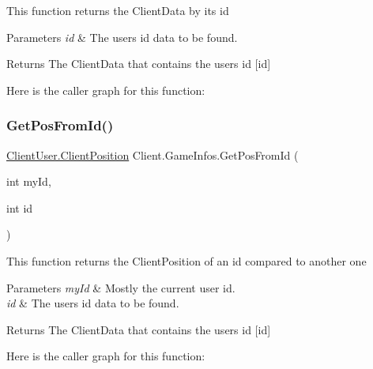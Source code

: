 This function returns the Client\+Data by its id 
\begin{DoxyParams}{Parameters}
{\em id} & The user\textquotesingle{}s id data to be found. \\
\hline
\end{DoxyParams}
\begin{DoxyReturn}{Returns}
The Client\+Data that contains the user\textquotesingle{}s id \mbox{[}id\mbox{]} 
\end{DoxyReturn}
Here is the caller graph for this function\+:
\mbox{\label{class_client_1_1_game_infos_aaa76a248bde67bb6bd73e36b9b57615f}} 
\subsubsection{\texorpdfstring{Get\+Pos\+From\+Id()}{GetPosFromId()}}
{\footnotesize\ttfamily \hyperlink{class_client_1_1_client_user_a346cb93cba9cd67a4de7410a02828cc7}{Client\+User.\+Client\+Position} Client.\+Game\+Infos.\+Get\+Pos\+From\+Id (\begin{DoxyParamCaption}\item[{int}]{my\+Id,  }\item[{int}]{id }\end{DoxyParamCaption})\hspace{0.3cm}{\ttfamily [inline]}}

This function returns the Client\+Position of an id compared to another one 
\begin{DoxyParams}{Parameters}
{\em my\+Id} & Mostly the current user id. \\
\hline
{\em id} & The user\textquotesingle{}s id data to be found. \\
\hline
\end{DoxyParams}
\begin{DoxyReturn}{Returns}
The Client\+Data that contains the user\textquotesingle{}s id \mbox{[}id\mbox{]} 
\end{DoxyReturn}
Here is the caller graph for this function\+:
\mbox{\label{class_client_1_1_game_infos_a2b9f1fda5fe14c3f6509a0fcd640577a}} 

